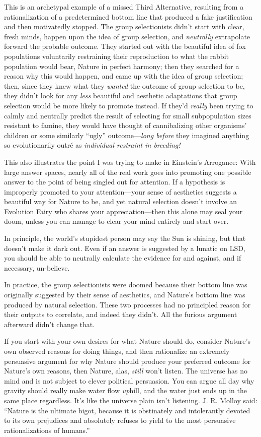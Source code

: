 {
 This is an archetypal example of a missed Third Alternative,
resulting from a rationalization of a predetermined bottom line that
produced a fake justification and then motivatedly stopped. The group
selectionists didn't start with clear, fresh minds,
happen upon the idea of group selection, and \textit{neutrally}
extrapolate forward the probable outcome. They started out with the
beautiful idea of fox populations voluntarily restraining their
reproduction to what the rabbit population would bear, Nature in
perfect harmony; then they searched for a reason why this would happen,
and came up with the idea of group selection; then, since they knew
what they \textit{wanted} the outcome of group selection to be, they
didn't look for any \textit{less} beautiful and
aesthetic adaptations that group selection would be more likely to
promote instead. If they'd \textit{really} been trying
to calmly and neutrally predict the result of selecting for small
subpopulation sizes resistant to famine, they would have thought of
cannibalizing other organisms' children or some
similarly ``ugly''
outcome---\textit{long before} they imagined anything so evolutionarily
outré as \textit{individual restraint in breeding!}}

{
 This also illustrates the point I was trying to make in
Einstein's Arrogance: With large answer spaces, nearly
all of the real work goes into promoting one possible answer to the
point of being singled out for attention. If a hypothesis is improperly
promoted to your attention---your sense of aesthetics suggests a
beautiful way for Nature to be, and yet natural selection
doesn't involve an Evolution Fairy who shares your
appreciation---then this alone may seal your doom, unless you can
manage to clear your mind entirely and start over.}

{
 In principle, the world's stupidest person may say
the Sun is shining, but that doesn't make it dark out.
Even if an answer is suggested by a lunatic on LSD, you should be able
to neutrally calculate the evidence for and against, and if necessary,
un-believe.}

{
 In practice, the group selectionists were doomed because their
bottom line was originally suggested by their sense of aesthetics, and
Nature's bottom line was produced by natural selection.
These two processes had no principled reason for their outputs to
correlate, and indeed they didn't. All the furious
argument afterward didn't change that.}

{
 If you start with your own desires for what Nature should do,
consider Nature's own observed reasons for doing
things, and then rationalize an extremely persuasive argument for why
Nature should produce your preferred outcome for
Nature's own reasons, then Nature, alas, \textit{still}
won't listen. The universe has no mind and is not
subject to clever political persuasion. You can argue all day why
gravity should really make water flow \textit{up}hill, and the water
just ends up in the same place regardless. It's like
the universe plain isn't listening. J. R. Molloy said:
``Nature is the ultimate bigot, because it is
obstinately and intolerantly devoted to its own prejudices and
absolutely refuses to yield to the most persuasive rationalizations of
humans.''}

